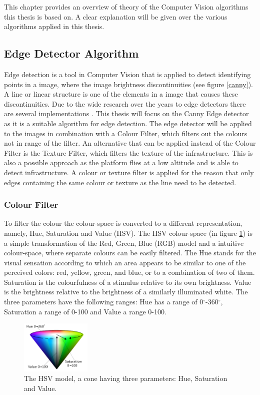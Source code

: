 \documentclass[a4paper]{article}
\begin{document}
This chapter provides an overview of theory of the Computer Vision algorithms this thesis is based on. A clear explanation will be given over the various algorithms applied in this thesis.

\subsection{Edge Detector Algorithm}
Edge detection is a tool in Computer Vision that is applied to detect identifying points in a image, where the image brightness discontinuities (see figure \ref{canny}). A line or linear structure is one of the elements in a image that causes these discontinuities. Due to the wide research over the years to edge detectors there are several implementations \cite{Ziou1998}. This thesis will focus on the Canny Edge detector as it is a suitable algorithm for edge detection. The edge detector will be applied to the images in combination with a Colour Filter, which filters out the colours not in range of the filter. An alternative that can be applied instead of the Colour Filter is the Texture Filter, which filters the texture of the infrastructure. This is also a possible approach as the platform flies at a low altitude and is able to detect infrastructure. A colour or texture filter is applied for the reason that only edges containing the same colour or texture as the line need to be detected.

\subsubsection{Colour Filter}
To filter the colour the colour-space is converted to a different representation, namely, Hue, Saturation and Value (HSV). The HSV colour-space (in figure \ref{hsv})  is a simple transformation of the Red, Green, Blue (RGB) model and a intuitive colour-space, where separate colours can be easily filtered. The Hue stands for the visual sensation according to which an area appears to be similar to one of the perceived colors: red, yellow, green, and blue, or to a combination of two of them. Saturation is the colourfulness of a stimulus relative to its own brightness. Value is the brightness relative to the brightness of a similarly illuminated white. The three parameters have the following ranges: Hue has a range of 0$^{\circ}$-360$^{\circ}$, Saturation a range of 0-100 and Value a range 0-100.

\begin{figure}[!ht]
\centering
\includegraphics[width=0.3\textwidth]{images/hsv.png}
\caption{The HSV model, a cone having three parameters: Hue, Saturation and Value.}
\label{hsv}
\end{figure}
\end{document}
